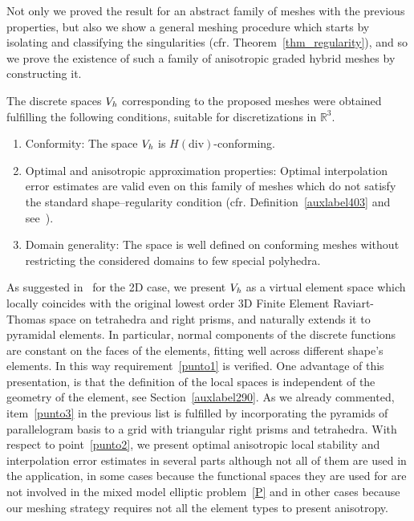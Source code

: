 Not only we proved the result for an abstract family of meshes with the previous 
properties, but also we show a general meshing procedure which starts by isolating and 
classifying the singularities (cfr. Theorem~\ref{thm_regularity}), and so we prove the 
existence of such 
a family of anisotropic graded hybrid meshes by 
constructing it.

The 
discrete spaces $V_{\textit h}$ 
corresponding 
to the proposed meshes
were obtained fulfilling
the following conditions, suitable for discretizations in $\mathbb{R}^3$.
\begin{enumerate}
\item \label{punto1} Conformity: 
The space $V_{\textit h}$ is $H(\mbox{div})$-conforming.
\item \label{punto2} Optimal and anisotropic approximation properties: 
Optimal interpolation error estimates are valid even on this family of 
meshes which do not satisfy the standard shape--regularity condition 
(cfr. Definition~\ref{auxlabel403} and see~\cite{ciarlet}).
\item \label{punto3} Domain generality: The space is well defined on 
conforming meshes without restricting the 
considered domains to few special polyhedra. 
\end{enumerate}
As suggested in~\cite{bfm} for the 2D case, we present $V_{\textit h}$ as a 
virtual element space which 
locally coincides with the original lowest order 3D Finite Element 
Raviart-Thomas space on
tetrahedra and right prisms, and naturally extends it to pyramidal elements. 
In particular, normal components of the discrete functions are constant on the 
faces of the 
elements, fitting well across different shape's elements. 
In this way requirement~\ref{punto1} is verified. 
One advantage of this presentation, is that the definition of the local spaces 
is independent of the 
geometry of the element, see Section~\ref{auxlabel290}. 
As we already commented, item~\ref{punto3} in the previous list is fulfilled
by incorporating the pyramids of parallelogram basis to a grid with triangular
right prisms and tetrahedra.
With respect to point~\ref{punto2}, we present optimal anisotropic local stability
and  
interpolation error estimates in several parts although not all of them
are used in the application, in some cases because the functional spaces 
they are used for are not involved in the  mixed model elliptic problem~\eqref{P}
and in other cases because our meshing strategy requires not all the element
types to present anisotropy.

